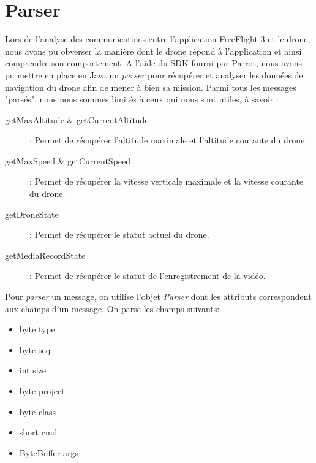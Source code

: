 \documentclass[12pt, openany]{report}
\begin{document}
\section{Parser}
Lors de l'analyse des communications entre l'application FreeFlight 3 et le drone, nous avons pu obverser la manière dont le drone répond à l'application et ainsi comprendre son comportement. A l'aide du SDK fourni par Parrot, nous avons pu mettre en place en Java un \textit{parser} pour récupérer et analyser les données de navigation du drone afin de mener à bien sa mission. Parmi tous les messages "parsés", nous nous sommes limités à ceux qui nous sont utiles, à savoir :
\begin{description}
\item[getMaxAltitude \& getCurrentAltitude] : Permet de récupérer l'altitude maximale et l'altitude courante du drone.
\item[getMaxSpeed \& getCurrentSpeed] : Permet de récupérer la vitesse verticale maximale et la vitesse courante du drone.
\item[getDroneState] : Permet de récupérer le statut actuel du drone.
\item[getMediaRecordState] : Permet de récupérer le statut de l'enregistrement de la vidéo.
\end{description}

Pour \textit{parser} un message, on utilise l'objet \textit{Parser} dont les attributs correspondent aux champs d'un message. On parse les champs suivants:
\begin{itemize}
\item byte type
\item byte seq
\item int size
\item byte project
\item byte class
\item short cmd
\item ByteBuffer args
\end{itemize}
\end{document}
